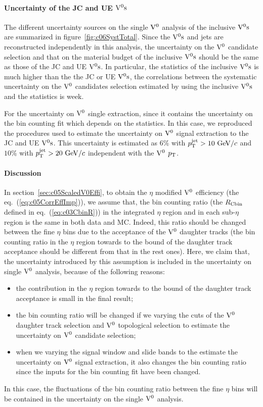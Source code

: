 \paragraph{Uncertainty of the JC and UE ${\rm V}^{0}{\rm s}$}
The different uncertainty sources on the single ${\rm V}^{0}$ analysis of the
inclusive ${\rm V}^{0}{\rm s}$ are summarized in figure~\ref{fig:c06SystTotal}.
Since the ${\rm V}^{0}{\rm s}$ and jets are reconstructed independently in this analysis,
the uncertainty on the ${\rm V}^{0}$ candidate selection and that on the material
budget of the inclusive ${\rm V}^{0}{\rm s}$ should be the same as those of the JC
and UE ${\rm V}^{0}{\rm s}$.
In particular, the statistics of the inclusive ${\rm V}^{0}{\rm s}$ is much higher
than the the JC or UE ${\rm V}^{0}{\rm s}$,
the correlations between the systematic uncertainty on the ${\rm V}^{0}$ candidates
selection estimated by using the inclusive ${\rm V}^{0}{\rm s}$ and the statistics is week.

For the uncertainty on ${\rm V}^{0}$ single extraction,
since it contains the uncertainty on the bin counting
fit which depends on the statistics.
In this case,
we reproduced the procedures used to estimate the uncertainty
on ${\rm V}^{0}$ signal extraction to the JC and UE ${\rm V}^{0}{\rm s}$.
This uncertainty is estimated
as $6\%$ with $p_{\rm T}^{\rm jet}>10~{\rm GeV}/c$ and $10\%$ with
$p_{\rm T}^{\rm jet}>20~{\rm GeV}/c$ independent with the ${\rm V}^{0}$ $p_{\rm T}$.

\paragraph{Discussion}
In section~\ref{sec:c05ScaledV0Effi},
to obtain the $\eta$ modified ${\rm V}^{0}$
efficiency (the eq.~(\ref{eq:c05CorrEffImp})),
we assume that, the bin counting ratio (the $R_{\rm Cbin}$ defined
in eq.~(\ref{eq:c03CbinR}))
in the integrated $\eta$ region and in each sub-$\eta$ region is the same in
both data and MC.
Indeed, this ratio should be changed between the fine $\eta$ bins
due to the acceptance of the ${\rm V}^{0}$ daughter
tracks (the bin counting ratio in the $\eta$ region towards to the bound of
the daughter track acceptance should be different from that in the rest ones).
Here, we claim that,
the uncertainty introduced by this assumption is included in the
uncertainty on single ${\rm V}^{0}$ analysis, because of the following reasons:
\begin{itemize}
\item the contribution in the $\eta$ region towards to the bound of the
      daughter track acceptance is small in the final result;
\item the bin counting ratio will be changed if we varying the cuts of
      the ${\rm V}^{0}$ daughter track selection and ${\rm V}^{0}$ topological
      selection to estimate the uncertainty on ${\rm V}^{0}$ candidate selection;
\item when we varying the signal window and slide bands to the estimate
      the uncertainty on ${\rm V}^{0}$ signal extraction,
      it also changes the bin counting ratio since the inputs for the bin
      counting fit have been changed.
\end{itemize}
In this case, the fluctuations of the bin counting ratio between the
fine $\eta$ bins will be contained in the uncertainty on the
single ${\rm V}^{0}$ analysis.

